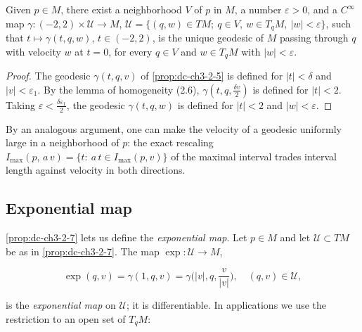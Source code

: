 \begin{proposition}
  \label{prop:dc-ch3-2-7}



  Given $p\in M$, there exist a neighborhood $V$ of $p$ in $M$, a number
  $\varepsilon>0$, and a $C^\infty$ map $\gamma:(-2,2)\times\mathcal{U}\to M$,
  $\mathcal{U}=\{(q,w)\in TM;\ q\in V,\ w\in T_qM,\ |w|<\varepsilon\}$, such that
  $t\mapsto\gamma(t,q,w)$, $t\in(-2,2)$, is the unique geodesic of $M$ passing
  through $q$ with velocity $w$ at $t=0$, for every $q\in V$ and $w\in T_qM$ with
  $|w|<\varepsilon$.
\end{proposition}
\begin{proof}

  \sketch
  The geodesic $\gamma(t,q,v)$ of \cref{prop:dc-ch3-2-5} is defined for
  $|t|<\delta$ and $|v|<\varepsilon_1$. By the lemma of homogeneity (2.6),
  $\gamma(t,q,\frac{\delta v}{2})$ is defined for $|t|<2$. Taking
  $\varepsilon<\frac{\delta\varepsilon_1}{2}$, the geodesic $\gamma(t,q,w)$ is
  defined for $|t|<2$ and $|w|<\varepsilon$.
\end{proof}

\begin{remark}
  \label{rem:dc-ch3-2-8}


  By an analogous argument, one can make the velocity of a geodesic uniformly large
  in a neighborhood of $p$: the exact rescaling
  $I_{\max}(p,\,a\,v)=\{t:\ a\,t\in I_{\max}(p,v)\}$ of the maximal interval
  trades interval length against velocity in both directions.
\end{remark}

\subsection{Exponential map}
\cref{prop:dc-ch3-2-7} lets us define the \emph{exponential map}. Let $p\in M$ and let
$\mathcal{U}\subset TM$ be as in \cref{prop:dc-ch3-2-7}. The map $\exp:\mathcal{U}\to M$,

$$
\exp(q,v)=\gamma(1,q,v)=\gamma\Big(|v|,q,\frac{v}{|v|}\Big),\quad(q,v)\in\mathcal{U},
$$

is the \emph{exponential map} on $\mathcal{U}$; it is differentiable. In applications
we use the restriction to an open set of $T_qM$:

